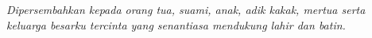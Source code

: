 \clearpage
{}
\begin{center}
  \vspace*{\fill}
  \emph{Dipersembahkan kepada orang tua, suami, anak, adik kakak, mertua serta keluarga besarku tercinta yang senantiasa mendukung lahir dan batin.}
  \vspace*{\fill}
\end{center}
